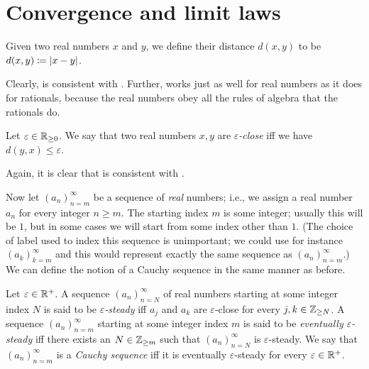 \section{Convergence and limit laws}\label{i:sec:6.1}

\begin{defn}\label{i:6.1.1}
  Given two real numbers \(x\) and \(y\), we define their distance \(d(x, y)\) to be \(d(x, y) \coloneqq \left\lvert x - y\right\rvert\).
\end{defn}

\begin{note}
  Clearly,  is consistent with .
  Further,  works just as well for real numbers as it does for rationals, because the real numbers obey all the rules of algebra that the rationals do.
\end{note}

\begin{defn}\label{i:6.1.2}
  Let \(\varepsilon \in \mathbb{R}_{\geq 0}\).
  We say that two real numbers \(x, y\) are \emph{\(\varepsilon\)-close} iff we have \(d(y, x) \leq \varepsilon\).
\end{defn}

\begin{note}
  Again, it is clear that  is consistent with .
\end{note}

\begin{note}
  Now let \((a_n)_{n = m}^\infty\) be a sequence of \emph{real} numbers;
  i.e., we assign a real number \(a_n\) for every integer \(n \geq m\).
  The starting index \(m\) is some integer;
  usually this will be \(1\), but in some cases we will start from some index other than \(1\).
  (The choice of label used to index this sequence is unimportant; we could use for instance \((a_k)_{k = m}^{\infty}\) and this would represent exactly the same sequence as \((a_n)_{n = m}^{\infty}\).)
  We can define the notion of a Cauchy sequence in the same manner as before.
\end{note}

\begin{defn}\label{i:6.1.3}
  Let \(\varepsilon \in \mathbb{R}^+\).
  A sequence \((a_n)_{n = N}^\infty\) of real numbers starting at some integer index \(N\) is said to be \emph{\(\varepsilon\)-steady} iff \(a_j\) and \(a_k\) are \(\varepsilon\)-close for every \(j, k \in \mathbb{Z}_{\geq N}\).
  A sequence \((a_n)_{n = m}^\infty\) starting at some integer index \(m\) is said to be \emph{eventually \(\varepsilon\)-steady} iff there exists an \(N \in \mathbb{Z}_{\geq m}\) such that \((a_n)_{n = N}^\infty\) is \(\varepsilon\)-steady.
  We say that \((a_n)_{n = m}^\infty\) is a \emph{Cauchy sequence} iff it is eventually \(\varepsilon\)-steady for every \(\varepsilon \in \mathbb{R}^+\).
\end{defn}


